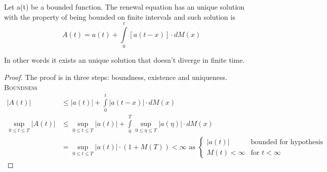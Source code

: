 \begin{theorem}[4.1 K.T. p.184]
  Let a(t) be a bounded function. The renewal equation has an unique solution with
  the property of being bounded on finite intervals and such solution is
  \begin{equation}
    A(t) = a(t) + \int\limits_0^{t}[a(t-x)] \cdot dM(x)
  \end{equation}
\end{theorem}
In other words it exists an unique solution that doesn't diverge in finite time.
\begin{proof}
  The proof is in three steps: boundness, existence and uniqueness.
  \proofpart
  \textsc{Boundness}\label{req:boundness}
  \begin{equation}\begin{split}
    |A(t)| & \le |a(t)| + \int\limits_0^{t}|a(t-x)| \cdot dM(x) \\
    \sup_{0\le t \le T} |A(t)| & \le \sup_{0\le t \le T} |a(t)| + \int\limits_0^{T}\sup_{0\le \eta \le T}|a(\eta)| \cdot dM(x)  \\
    & = \sup_{0\le t \le T} |a(t)| \cdot (1+M(T)) < \infty \text{ as }
    \begin{cases}
      |a(t)| & \text{bounded for hypothesis} \\
      M(t) < \infty & \text{for } t<\infty
    \end{cases}
  \end{split}\end{equation}


\end{proof}
